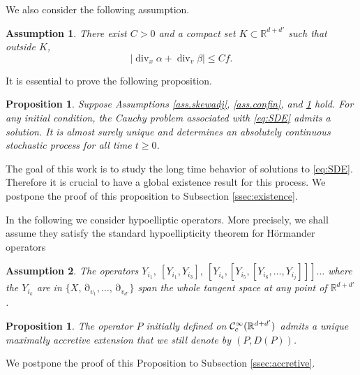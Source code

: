 \documentclass[12pt]{amsart}
\newcommand{\R}{\mathbb R}
\renewcommand{\div}{\operatorname{div}}
\numberwithin{equation}{section}
\numberwithin{figure}{section}
\DeclareMathOperator{\p}{\partial}
\newtheorem{proposition}[defin]{Proposition}
\newtheorem{assumption}{Assumption}
\begin{document}
We also consider the following assumption.
\begin{assumption}\label{ass.accretive}
    There exist $C>0$ and a compact set $K\subset\R^{d+d'}$ such that outside $K$,
    \begin{equation*}
    |\div_x \alpha + \div_v\beta|\leq Cf.
    \end{equation*}
\end{assumption}
It is essential to prove the following proposition.
\begin{proposition}\label{prop:existence}
    Suppose Assumptions \ref{ass.skewadj}, \ref{ass.confin}, and \ref{ass.accretive} hold. For any initial condition, the Cauchy problem associated with \eqref{eq:SDE} admits a solution. It is almost surely unique and determines an absolutely continuous stochastic process for all time $t\geq0$.
\end{proposition}
The goal of this work is to study the long time behavior of solutions to \eqref{eq:SDE}. Therefore it is crucial to have a global existence result for this process. We postpone the proof of this proposition to Subsection \ref{ssec:existence}.

In the following we consider hypoelliptic operators. More precisely, we shall assume they satisfy the standard hypoellipticity theorem for Hörmander operators \cite[Theorem 1.1]{Ho67}
\begin{assumption}\label{ass.Hormander}
    The operators $Y_{i_1},\ [Y_{i_1},Y_{i_3}],\ [Y_{i_4},[Y_{i_5},[Y_{i_6},\ldots,Y_{i_j}]]]\ldots$ where the $Y_{i_k}$ are in $\{X,\p_{v_1},\ldots,\p_{v_{d'}}\}$ span the whole tangent space at any point of $\R^{d+d'}$.
\end{assumption}

\begin{proposition}\label{prop:accretive}
The operator $P$ initially defined on $\ccc^\infty_c(\R^{d+d'})$ admits a unique maximally accretive extension that we still denote by $(P,D(P))$.
\end{proposition}
We postpone the proof of this Proposition to Subsection \ref{ssec:accretive}.
\end{document}
